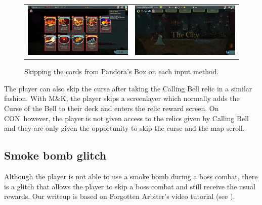\documentclass[12pt]{amsart}
\newcommand{\mk}{\textsf{M\&K}}
\newcommand{\con}{\textsf{CON}}
\begin{document}
\begin{figure}[h]
    \centering
    \begin{tabular}{c|c}
        \includegraphics[scale=.3]{graphics/PandorasBoxGlitchMK.png} & 
        \includegraphics[scale=.3]{graphics/PandorasBoxGlitchCON.png}
    \end{tabular}
    \caption{Skipping the cards from Pandora's Box on each input method.  }
    \label{fig: Pandora's Box glitch}
\end{figure}
The player can also skip the curse after taking the Calling Bell relic in a similar fashion.  
With \mk, the player skips a screenlayer which normally adds the Curse of the Bell to their deck and enters the relic reward screen.  
On \con~however, the player is not given access to the relics given by Calling Bell and they are only given the opportunity to skip the curse and the map scroll.  
\subsection{Smoke bomb glitch}\label{sub-sec: smoke bomb glitch}
Although the player is not able to use a smoke bomb during a boss combat, there is a glitch that allows the player to skip a boss combat and still receive the usual rewards.  
Our writeup is based on Forgotten Arbiter's video tutorial (see \cite{ForgottenArbiterMoreGlitches}).  
\\
\end{document}
